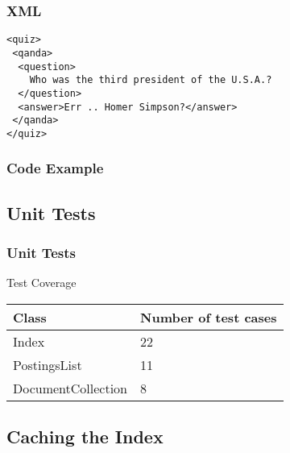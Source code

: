 \documentclass{beamer}
\begin{document}
\begin{frame}[fragile]

  \frametitle{XML}

\begin{verbatim}
<quiz>
 <qanda>
  <question>
    Who was the third president of the U.S.A.?
  </question>
  <answer>Err .. Homer Simpson?</answer>
 </qanda>
</quiz>
\end{verbatim}

\end{frame}


\begin{frame}[fragile]

  \frametitle{Code Example}

  \lstReadXml

\end{frame}


\subsection{Unit Tests}

\begin{frame}
  \frametitle{Unit Tests}

  \begin{block}{Test Coverage}
    \begin{tabular}{ l | l }
      Class & Number of test cases \\ \hline
      Index & 22 \\
      PostingsList & 11 \\
      DocumentCollection & 8 \\
    \end{tabular}
  \end{block}
\end{frame}

\subsection{Caching the Index}
\end{document}
